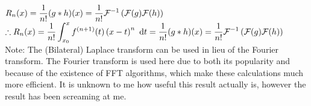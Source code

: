 \documentclass{article}
\newcommand{\dispint}{\displaystyle \int}
\newcommand{\dispthere}{\displaystyle \therefore}
\begin{document}
	\newline
	\(
		\displaystyle R_n(x) = \frac{1}{n!}(g*h)(x) = \frac{1}{n!} \mathcal F^{-1} \left( \mathcal F(g) \mathcal F(h) \right) \\
	\)
	\newline
	\(
		\dispthere R_n(x) = \frac{1}{n!}\dispint_{x_0}^x f^{(n+1)}(t) \left( x - t\right)^n \text{ d}t  = \frac{1}{n!}(g*h)(x) = \frac{1}{n!} \mathcal F^{-1} \left( \mathcal F(g) \mathcal F(h) \right) \\
	\)
	\newline
	\newline
	Note: The (Bilateral) Laplace transform can be used in lieu of the Fourier transform. The Fourier transform is used here due to both its popularity and because of the existence of FFT algorithms, which make these calculations much more efficient. It is unknown to me how useful this result actually is, however the result has been screaming at me.
\end{document}
